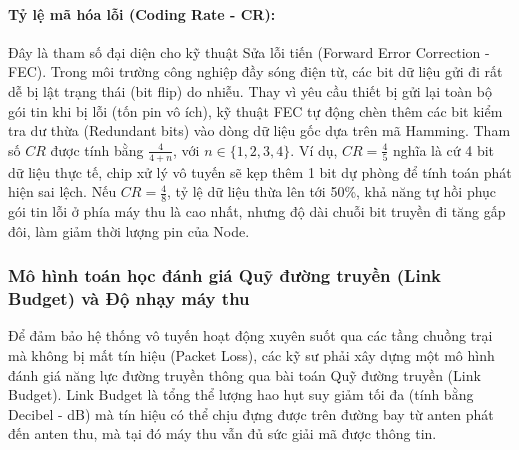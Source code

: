 \paragraph{Tỷ lệ mã hóa lỗi (Coding Rate - CR):}
Đây là tham số đại diện cho kỹ thuật Sửa lỗi tiến (Forward Error Correction - FEC). Trong môi trường công nghiệp đầy sóng điện từ, các bit dữ liệu gửi đi rất dễ bị lật trạng thái (bit flip) do nhiễu. Thay vì yêu cầu thiết bị gửi lại toàn bộ gói tin khi bị lỗi (tốn pin vô ích), kỹ thuật FEC tự động chèn thêm các bit kiểm tra dư thừa (Redundant bits) vào dòng dữ liệu gốc dựa trên mã Hamming. Tham số $CR$ được tính bằng $\frac{4}{4+n}$, với $n \in \{1, 2, 3, 4\}$. Ví dụ, $CR = \frac{4}{5}$ nghĩa là cứ 4 bit dữ liệu thực tế, chip xử lý vô tuyến sẽ kẹp thêm 1 bit dự phòng để tính toán phát hiện sai lệch. Nếu $CR = \frac{4}{8}$, tỷ lệ dữ liệu thừa lên tới 50\%, khả năng tự hồi phục gói tin lỗi ở phía máy thu là cao nhất, nhưng độ dài chuỗi bit truyền đi tăng gấp đôi, làm giảm thời lượng pin của Node.
\subsubsection{Mô hình toán học đánh giá Quỹ đường truyền (Link Budget) và Độ nhạy máy thu}
Để đảm bảo hệ thống vô tuyến hoạt động xuyên suốt qua các tầng chuồng trại mà không bị mất tín hiệu (Packet Loss), các kỹ sư phải xây dựng một mô hình đánh giá năng lực đường truyền thông qua bài toán Quỹ đường truyền (Link Budget). Link Budget là tổng thể lượng hao hụt suy giảm tối đa (tính bằng Decibel - dB) mà tín hiệu có thể chịu đựng được trên đường bay từ anten phát đến anten thu, mà tại đó máy thu vẫn đủ sức giải mã được thông tin.

